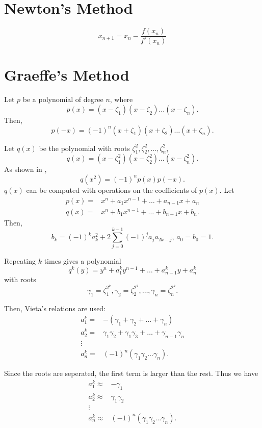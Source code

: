 \documentclass{article}
\begin{document}
\section{Newton's Method}

\begin{equation}
	x_{n+1}=x_n-\frac{f(x_n)}{f'(x_n)}
\end{equation}

\section{Graeffe's Method}

Let $p$ be a polynomial of degree $n$, where 
\[p(x)=(x-\zeta_1)(x-\zeta_2)\dots(x-\zeta_n).\]
Then,
\[p(-x)=(-1)^n(x+\zeta_1)(x+\zeta_2)\dots(x+\zeta_n).\]

Let $q(x)$ be the polynomial with roots $\zeta_1^2,\zeta_2^2,\dots,\zeta_n^2$,
\[q(x)=(x-\zeta_1^2)(x-\zeta_2^2)\dots(x-\zeta_n^2).\]
As shown in \cite{wiki:graeffe}, 
\[q(x^2)=(-1)^np(x)p(-x).\]
$q(x)$ can be computed with operations on the coefficients of $p(x)$.
Let
\begin{align*}
	p(x) =& x^n+a_1x^{n-1}+\dots+a_{n-1}x+a_n \\
	q(x) =& x^n+b_1x^{n-1}+\dots+b_{n-1}x+b_n. 
\end{align*}
Then,
\[b_k=(-1)^ka_k^2+2\sum_{j=0}^{k-1}(-1)^ja_ja_{2k-j},\,a_0=b_0=1.\]

Repeating $k$ times gives a polynomial
\[q^k(y)=y^n+a_1^ky^{n-1}+\dots+a_{n-1}^ky+a_n^k\]
with roots
\[\gamma_1=\zeta_1^{2^k},\gamma_2=\zeta_2^{2^k},\dots,\gamma_n=\zeta_n^{2^k}.\]

Then, Vieta's relations\cite{wiki:vieta} are used: 
\begin{align*}
	a_1^k =& -(\gamma_1+\gamma_2+\dots+\gamma_n) \\
	a_2^k =& \gamma_1\gamma_2+\gamma_1\gamma_3+\dots+\gamma_{n-1}\gamma_n \\
	\vdots & \\
	a_n^k =& (-1)^n(\gamma_1\gamma_2\dots\gamma_n).
\end{align*}

Since the roots are seperated, the first term is larger than the rest.\cite{mathworld:graeffe}
Thus we have
\begin{align*}
	a_1^k \approx& -\gamma_1 \\
	a_2^k \approx& \gamma_1\gamma_2 \\
	\vdots & \\
	a_n^k \approx& (-1)^n(\gamma_1\gamma_2\dots\gamma_n).
\end{align*}
\end{document}
